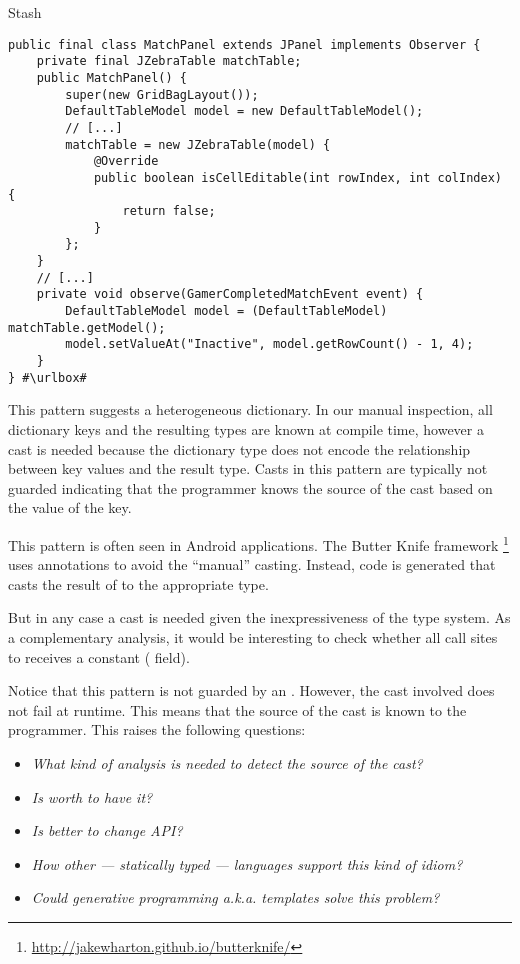 \begin{pattern}{Stash}
\def\urlvar{http://bit.ly/ggp_org_ggp_base_2SAEXHu}
\begin{verbatim}
public final class MatchPanel extends JPanel implements Observer {
    private final JZebraTable matchTable;
    public MatchPanel() {
        super(new GridBagLayout());
        DefaultTableModel model = new DefaultTableModel();
        // [...]
        matchTable = new JZebraTable(model) {
            @Override
            public boolean isCellEditable(int rowIndex, int colIndex) {
                return false;
            }
        };
    }
    // [...]
    private void observe(GamerCompletedMatchEvent event) {
        DefaultTableModel model = (DefaultTableModel) matchTable.getModel();
        model.setValueAt("Inactive", model.getRowCount() - 1, 4);
    }
} #\urlbox#
\end{verbatim}






\discussion{}
This pattern suggests a heterogeneous dictionary.
In our manual inspection,
all dictionary keys and the resulting types are known at compile time,
however a cast is needed because the dictionary type does not encode the
relationship between key values and the result type.
Casts in this pattern are typically not guarded indicating that the programmer
knows the source of the cast based on the value of the key.

This pattern is often seen in Android applications.
The Butter Knife framework%
\footnote{\url{http://jakewharton.github.io/butterknife/}}
uses annotations to avoid the ``manual'' casting.
Instead, code is generated that casts the result of  to the
appropriate type.




But in any case a cast is needed given the inexpressiveness of the type system.
As a complementary analysis,
it would be interesting to check whether all call sites to
 receives a constant ( field).

Notice that this pattern is not guarded by an .
However, the cast involved does not fail at runtime.
This means that the source of the cast is known to the programmer.
This raises the following questions:
\begin{itemize}
\item \emph{What kind of analysis is needed to detect the source of the cast?}
\item \emph{Is worth to have it?}
\item \emph{Is better to change API?}
\item \emph{How other --- statically typed --- languages support this kind of idiom?}
\item \emph{Could generative programming a.k.a. templates solve this problem?}
\end{itemize} 



\end{pattern}
